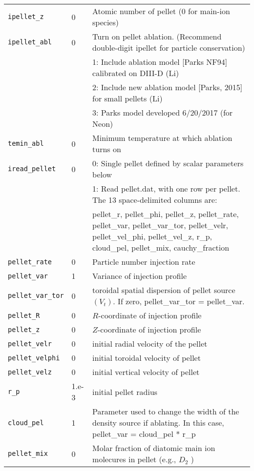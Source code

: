 \begin{tabular}{llp{4.5in}}
  \texttt{ipellet\_z}  & 0  & Atomic number of pellet (0 for main-ion species) \\
  \texttt{ipellet\_abl} & 0 & Turn on pellet ablation.  (Recommend double-digit ipellet for particle conservation) \\
                        &   & 1: Include ablation model [Parks NF94] calibrated on DIII-D (Li) \\
                        &   & 2: Include new ablation model [Parks, 2015] for small pellets (Li) \\
                        &   & 3: Parks model developed 6/20/2017 (for Neon) \\
  \texttt{temin\_abl}   & 0 & Minimum temperature at which ablation turns on \\
  \texttt{iread\_pellet}& 0 & 0: Single pellet defined by scalar parameters below \\
                        &   & 1: Read pellet.dat, with one row per pellet.   The 13
                                 space-delimited columns are: \\
                        &   & pellet\_r, pellet\_phi, pellet\_z, pellet\_rate, pellet\_var,
                              pellet\_var\_tor, pellet\_velr, pellet\_vel\_phi,
                              pellet\_vel\_z, r\_p, cloud\_pel, pellet\_mix, cauchy\_fraction \\    
  \texttt{pellet\_rate} & 0 & Particle number injection rate\\
  \texttt{pellet\_var}  & 1    & Variance of injection profile\\
  \texttt{pellet\_var\_tor} & 0 & toroidal spatial dispersion of pellet source $(V_t)$.  
                                  If zero, pellet\_var\_tor = pellet\_var. \\
  \texttt{pellet\_R}    & 0 & $R$-coordinate of injection profile\\
  \texttt{pellet\_z}    & 0 & $Z$-coordinate of injection profile\\
  \texttt{pellet\_velr} & 0 & initial radial velocity of the pellet \\
  \texttt{pellet\_velphi} & 0 & initial toroidal velocity of pellet \\
  \texttt{pellet\_velz}   & 0 & initial vertical velocity of pellet \\
  \texttt{r\_p}           & 1.e-3 & initial pellet radius \\
  \texttt{cloud\_pel}     & 1     & Parameter used to change the width of the density source if
                                    ablating.   In this case, pellet\_var = cloud\_pel * r\_p \\
  \texttt{pellet\_mix}   & 0 & Molar fraction of diatomic main ion molecures in pellet (e.g., $D_2$ )

\end{tabular}
